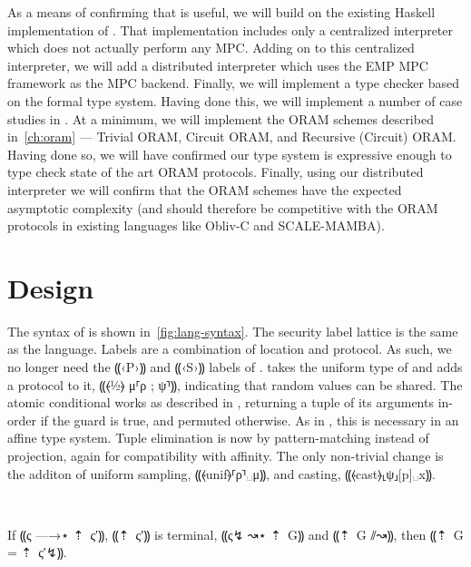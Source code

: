 As a means of confirming that \lang is useful, we will build on the existing Haskell implementation of \mpc. That implementation
includes only a centralized interpreter which does not actually perform any MPC. Adding on to this centralized interpreter, we will
add a distributed interpreter which uses the EMP MPC framework as the MPC backend. Finally, we will implement a type checker based
on the formal type system. Having done this, we will implement a number of case studies in \lang. At a minimum, we will implement
the ORAM schemes described in~\cref{ch:oram} --- Trivial ORAM, Circuit ORAM, and Recursive (Circuit) ORAM. Having done so, we will
have confirmed our type system is expressive enough to type check state of the art ORAM protocols. Finally, using our distributed
interpreter we will confirm that the ORAM schemes have the expected asymptotic complexity (and should therefore be competitive with
the ORAM protocols in existing languages like Obliv-C and SCALE-MAMBA).

\section{Design}

The syntax of \lang is shown in~\cref{fig:lang-syntax}. The security label lattice is the same as
the \mpc language. Labels are a combination of location and protocol. As such, we no longer need the ⸨‹P›⸩ and ⸨‹S›⸩ labels
of \obliv. \lang takes the uniform type of \obliv and adds a protocol to it, ⸨⦑½⦒ μ⸢ρ ; ψ⸣⸩, indicating that random values
can be shared. The atomic conditional works as described in \obliv, returning a tuple of its arguments in-order if the guard
is true, and permuted otherwise. As in \obliv, this is necessary in an affine type system. Tuple elimination is now by
pattern-matching instead of projection, again for compatibility with affinity. The only non-trivial change is the additon of
uniform sampling, ⸨⦑unif⦒⸢ρ⸣␣μ⸩, and casting, ⸨⦑cast⦒⸤ψ⸥[p]␣x⸩.

 \\


\begin{theorem} \label{thm:lang-simulation}
  If ⸨ς —→⋆ ⇡~{ς′}⸩, ⸨⇡~{ς′}⸩ is terminal, ⸨ς↯ ↝⋆ ⇡~{G}⸩ and ⸨⇡~{G} ⫽↝⸩, then ⸨⇡~{G} = ⇡~{ς′}↯⸩.
\end{theorem}


